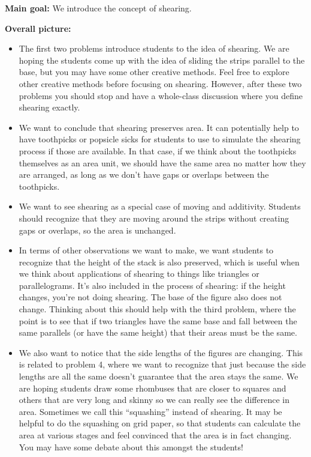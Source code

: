 \documentclass[nooutcomes,noauthor, handout]{ximera}
\begin{document}
\newpage

\begin{instructorNotes} 



{\bf Main goal:} We introduce the concept of shearing.

{\bf Overall picture:} 


\begin{itemize}
	\item The first two problems introduce students to the idea of shearing. We are hoping the students come up with the idea of sliding the strips parallel to the base, but you may have some other creative methods. Feel free to explore other creative methods before focusing on shearing. However, after these two problems you should stop and have a whole-class discussion where you define shearing exactly.
	\item We want to conclude that shearing preserves area. It can potentially help to have toothpicks or popsicle sicks for students to use to simulate the shearing process if those are available. In that case, if we think about the toothpicks themselves as an area unit, we should have the same area no matter how they are arranged, as long as we don't have gaps or overlaps between the toothpicks. 
	\item We want to see shearing as a special case of moving and additivity. Students should recognize that they are moving around the strips without creating gaps or overlaps, so the area is unchanged.
	\item In terms of other observations we want to make, we want students to recognize that the height of the stack is also preserved, which is useful when we think about applications of shearing to things like triangles or parallelograms. It's also included in the process of shearing: if the height changes, you're not doing shearing. The base of the figure also does not change. Thinking about this should help with the third problem, where the point is to see that if two triangles have the same base and fall between the same parallels (or have the same height) that their areas must be the same.
	\item We also want to notice that the side lengths of the figures are changing. This is related to problem 4, where we want to recognize that just because the side lengths are all the same doesn't guarantee that the area stays the same. We are hoping students draw some rhombuses that are closer to squares and others that are very long and skinny so we can really see the difference in area. Sometimes we call this ``squashing'' instead of shearing. It may be helpful to do the squashing on grid paper, so that students can calculate the area at various stages and feel convinced that the area is in fact changing. You may have some debate about this amongst the students!

\end{itemize}
\end{instructorNotes}
\end{document}

